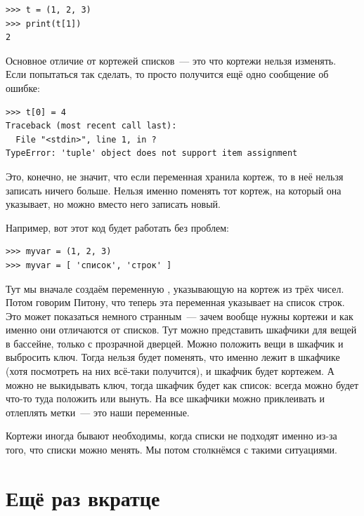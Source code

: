 \begin{listing}
\begin{verbatim}
>>> t = (1, 2, 3)
>>> print(t[1])
2
\end{verbatim}
\end{listing}

Основное отличие от кортежей списков — это что кортежи нельзя изменять. Если попытаться так сделать, то просто получится ещё одно сообщение об ошибке:

\begin{listing}
\begin{verbatim}
>>> t[0] = 4
Traceback (most recent call last):
  File "<stdin>", line 1, in ?
TypeError: 'tuple' object does not support item assignment
\end{verbatim}
\end{listing}

Это, конечно, не значит, что если переменная хранила кортеж, то в неё нельзя записать ничего больше. Нельзя именно поменять тот кортеж, на который она указывает, но можно вместо него записать новый.

Например, вот этот код будет работать без проблем:

\begin{listing}
\begin{verbatim}
>>> myvar = (1, 2, 3)
>>> myvar = [ 'список', 'строк' ]
\end{verbatim}
\end{listing}

Тут мы вначале создаём переменную , указывающую на кортеж из трёх чисел. Потом говорим Питону, что теперь эта переменная указывает на список строк. Это может показаться немного странным — зачем вообще нужны кортежи и как именно они отличаются от списков. Тут можно представить шкафчики для вещей в бассейне, только с прозрачной дверцей. Можно положить вещи в шкафчик и выбросить ключ. Тогда нельзя будет поменять, что именно лежит в шкафчике (хотя посмотреть на них всё-таки получится), и шкафчик будет кортежем. А можно не выкидывать ключ, тогда шкафчик будет как список: всегда можно будет что-то туда положить или вынуть. На все шкафчики можно приклеивать и отлеплять метки — это наши переменные.

Кортежи иногда бывают необходимы, когда списки не подходят именно из-за того, что списки можно менять. Мы потом столкнёмся с такими ситуациями.

\section{Ещё раз вкратце}

